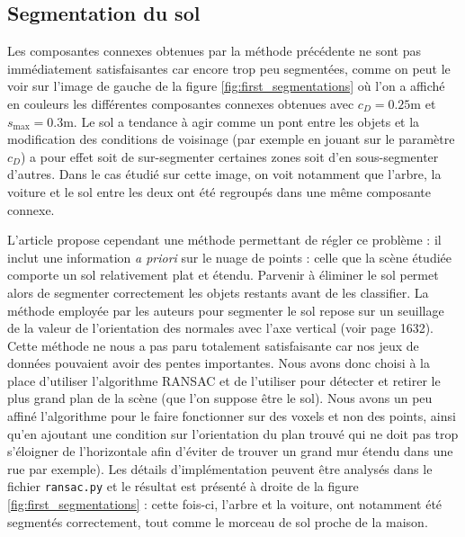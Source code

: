 \documentclass[a4paper, onecolumn, 11pt]{article}
\begin{document}
\subsection{Segmentation du sol}
\label{segmentation-sol}
Les composantes connexes obtenues par la méthode précédente ne sont pas immédiatement satisfaisantes car encore trop peu segmentées, comme on peut le voir sur l'image de gauche de la figure \ref{fig:first_segmentations} où l'on a affiché en couleurs les différentes composantes connexes obtenues avec $c_D = 0.25\text{m}$ et $s_\text{max}=0.3\text{m}$. Le sol a tendance à agir comme un pont entre les objets et la modification des conditions de voisinage (par exemple en jouant sur le paramètre $c_D$) a pour effet soit de sur-segmenter certaines zones soit d'en sous-segmenter d'autres. Dans le cas étudié sur cette image, on voit notamment que l'arbre, la voiture et le sol entre les deux ont été regroupés dans une même composante connexe. 

L'article propose cependant une méthode permettant de régler ce problème : il inclut une information \emph{a priori} sur le nuage de points : celle que la scène étudiée comporte un sol relativement plat et étendu. Parvenir à éliminer le sol permet alors de segmenter correctement les objets restants avant de les classifier.
La méthode employée par les auteurs pour segmenter le sol repose sur un seuillage de la valeur de l'orientation des normales avec l'axe vertical (voir page 1632). Cette méthode ne nous a pas paru totalement satisfaisante car nos jeux de données pouvaient avoir des pentes importantes. Nous avons donc choisi à la place d'utiliser l'algorithme RANSAC \cite{ransac} et de l'utiliser pour détecter et retirer le plus grand plan de la scène (que l'on suppose être le sol). Nous avons un peu affiné l'algorithme pour le faire fonctionner sur des voxels et non des points, ainsi qu'en ajoutant une condition sur l'orientation du plan trouvé qui ne doit pas trop s'éloigner de l'horizontale afin d'éviter de trouver un grand mur étendu dans une rue par exemple). Les détails d'implémentation peuvent être analysés dans le fichier \texttt{ransac.py} et le résultat est présenté à droite de la figure \ref{fig:first_segmentations} : cette fois-ci, l'arbre et la voiture, ont notamment été segmentés correctement, tout comme le morceau de sol proche de la maison.
\end{document}
